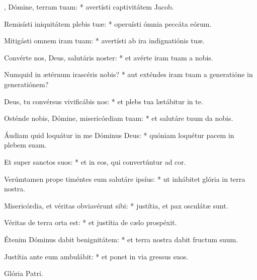 \begin{psalmus}

    , Dómine, terram tuam: * avertísti captivitátem Jacob.

    Remisísti iniquitátem plebis tuæ: * operuísti ómnia peccáta eórum.

    Mitigásti omnem iram tuam: * avertísti ab ira indignatiónis tuæ.

    Convérte nos, Deus, salutáris noster: * et avérte iram tuam a nobis.

    Numquid in ætérnum irascéris nobis? * aut exténdes iram tuam a generatióne in generatiónem?

    Deus, tu convérsus vivificábis nos: * et plebs tua lætábitur in te.

    Osténde nobis, Dómine, misericórdiam tuam: * et salutáre tuum da nobis.

    Áudiam quid loquátur in me Dóminus Deus: * quóniam loquétur pacem in plebem suam.

    Et super sanctos suos: * et in eos, qui convertúntur ad cor.

    Verúmtamen prope timéntes eum salutáre ipsíus: * ut inhábitet glória in terra nostra.

    Misericórdia, et véritas obviavérunt sibi: * justítia, et pax osculátæ sunt.

    Véritas de terra orta est: * et justítia de cælo prospéxit.

    Étenim Dóminus dabit benignitátem: * et terra nostra dabit fructum suum.

    Justítia ante eum ambulábit: * et ponet in via gressus suos.

		Glória Patri.

\end{psalmus}
